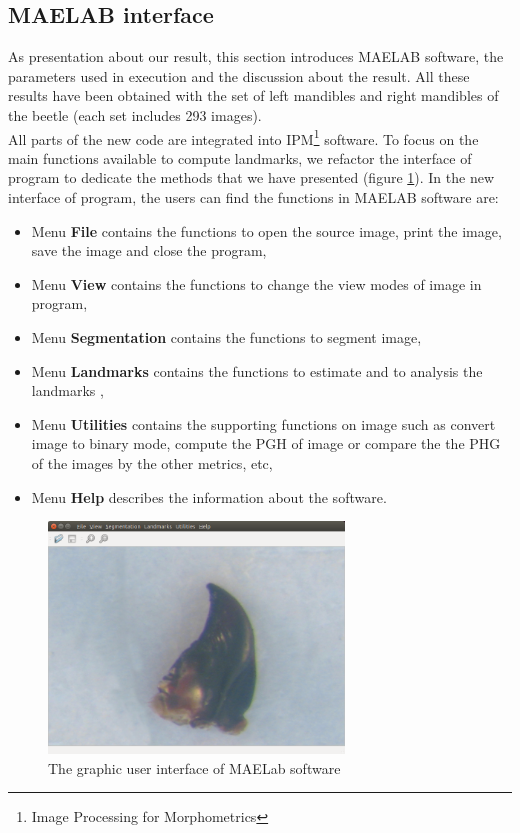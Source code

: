 \subsection{MAELAB interface}
As presentation about our result, this section introduces MAELAB software, the parameters used in execution and the discussion about the result. All these results have been obtained with the set of left mandibles and right mandibles of the beetle (each set includes 293 images).\\
All parts of the new code are integrated into IPM\footnote{Image Processing for Morphometrics} software. To focus on the main functions available to compute landmarks, we refactor the interface of program to dedicate the methods that we have presented (figure \ref{fig:44}).
In the new interface of program, the users can find the functions in MAELAB software are:
\begin{itemize}
\item Menu \textbf{File} contains the functions to open the source image, print the image, save the image and close the program,
\item Menu \textbf{View} contains the functions to change the view modes of image in program,
\item Menu \textbf{Segmentation} contains the functions to segment image,
\item Menu \textbf{Landmarks} contains the functions to estimate and to analysis the landmarks ,
\item Menu \textbf{Utilities} contains the supporting functions on image such as convert image to binary mode, compute the PGH of image or compare the the PHG of the images by the other metrics, etc,
\item Menu \textbf{Help} describes the information about the software.
\end{itemize}
\begin{figure}[h!]
\centering
\includegraphics[width=0.7\textwidth]{./images/software}
\caption{The graphic user interface of MAELab software}
\label{fig:44}
\end{figure}
